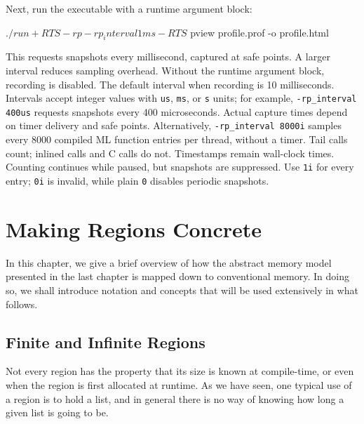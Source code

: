 \documentclass[12pt]{book}
\begin{document}
Next, run the executable with a runtime argument block:
\begin{scriptcode}[mathescape=false]
  $ ./run +RTS -rp -rp_interval 1ms -RTS
  $ pview profile.prof -o profile.html
\end{scriptcode}
This requests snapshots every millisecond, captured at safe points. A larger
interval reduces sampling overhead. Without the runtime argument block, recording
is disabled. The default interval when recording is 10 milliseconds.
Intervals accept integer values with \texttt{us}, \texttt{ms}, or \texttt{s}
units; for example, \lstinline{-rp_interval 400us} requests snapshots every
400 microseconds. Actual capture times depend on timer delivery and safe points.
Alternatively, \lstinline{-rp_interval 8000i} samples every 8000 compiled ML
function entries per thread, without a timer. Tail calls count; inlined calls
and C calls do not. Timestamps remain wall-clock times. Counting continues while
paused, but snapshots are suppressed. Use \texttt{1i} for every entry; \texttt{0i}
is invalid, while plain \texttt{0} disables periodic snapshots.

\chapter{Making Regions Concrete}
In this chapter, we give a brief overview of how the abstract memory model
presented in the last chapter is mapped down to conventional memory. In doing
so, we shall introduce notation and concepts that will be used extensively in
what follows.

\section{Finite and Infinite Regions}
\label{fininf.sec}
Not every region has the property that its size is known at compile-time, or
even when the region is first allocated at runtime.  As we have seen, one
typical use of a region is to hold a list, and in general there is no way of
knowing how long a given list is going to be.
\end{document}
